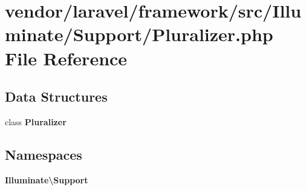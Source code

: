 \section{vendor/laravel/framework/src/\+Illuminate/\+Support/\+Pluralizer.php File Reference}
\label{_pluralizer_8php}
\subsection*{Data Structures}
\begin{DoxyCompactItemize}
\item 
class {\bf Pluralizer}
\end{DoxyCompactItemize}
\subsection*{Namespaces}
\begin{DoxyCompactItemize}
\item 
 {\bf Illuminate\textbackslash{}\+Support}
\end{DoxyCompactItemize}
